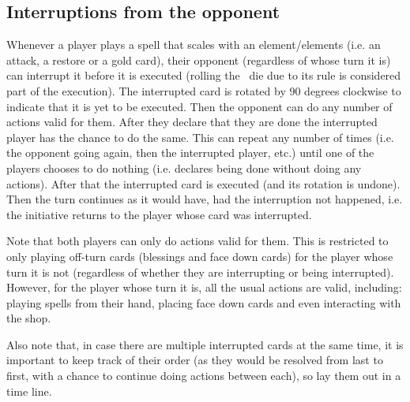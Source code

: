 \documentclass[dvipsnames,parskip,a4paper]{scrartcl}
\newcommand{\iconsize}{3.4mm}
\newcommand{\icondepth}{0.45mm}
\newcommand{\icon}[1]{\raisebox{-\icondepth}{\texttt{[image:  \#1 ]}}}
\newcommand{\chance}{\icon{icons/chance.png}}
\begin{document}
\subsection*{Interruptions from the opponent}

Whenever a player plays a spell that scales with an element/elements (i.e. an attack, a restore or a gold card), their opponent (regardless of whose turn it is) can interrupt it before it is executed (rolling the \chance \ die due to its rule is considered part of the execution). The interrupted card is rotated by 90 degrees clockwise to indicate that it is yet to be executed. Then the opponent can do any number of actions valid for them. After they declare that they are done the interrupted player has the chance to do the same. This can repeat any number of times (i.e. the opponent going again, then the interrupted player, etc.) until one of the players chooses to do nothing (i.e. declares being done without doing any actions). After that the interrupted card is executed (and its rotation is undone). Then the turn continues as it would have, had the interruption not happened, i.e. the initiative returns to the player whose card was interrupted.

\vspace{4pt}

Note that both players can only do actions valid for them. This is restricted to only playing off-turn cards (blessings and face down cards) for the player whose turn it is not (regardless of whether they are interrupting or being interrupted). However, for the player whose turn it is, all the usual actions are valid, including: playing spells from their hand, placing face down cards and even interacting with the shop.

\vspace{4pt}

Also note that, in case there are multiple interrupted cards at the same time, it is important to keep track of their order (as they would be resolved from last to first, with a chance to continue doing actions between each), so lay them out in a time line.

\vspace{4pt}
\end{document}
